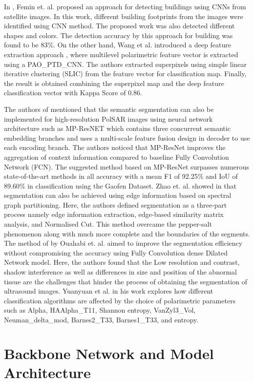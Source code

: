 \documentclass[a4paper,12pt]{spieman}  %
\begin{document}
\begin{spacing}{1}
\par In \citep{femin2020accurate}, Femin et. al. proposed an approach for detecting buildings using CNNs from satellite images. In this work, different building footprints from the images were identified using CNN method. The proposed work was also detected different shapes and colors. The detection accuracy by this approach for building was found to be 83\%. On the other hand, Wang et al. introduced a deep feature extraction approach \citep{PAOPTDCNN}, where multilevel polarimetric feature vector is extracted using a PAO\_PTD\_CNN. The authors extracted superpixels using simple linear iterative clustering (SLIC) from the feature vector for classification map. Finally, the result is obtained combining the superpixel map and the deep feature classification vector with Kappa Score of 0.86.
\par The authors of \citep{Ding_2021} mentioned that the semantic segmentation can also be implemented for high-resolution PolSAR images using neural network architecture such as MP-ResNET which contains three concurrent semantic embedding branches and uses a multi-scale feature fusion design in decoder to use each encoding branch. The authors noticed that MP-ResNet improves the aggregation of context information compared to baseline Fully Convolution Network (FCN). The suggested method based on MP-ResNet surpasses numerous state-of-the-art methods in all accuracy with a mean F1 of 92.25\% and IoU of 89.60\% in classification using the Gaofen Dataset. Zhao et. al. showed in \citep{zhao2013segmentation} that segmentation can also be achieved using edge information based on spectral graph partitioning. Here, the authors defined segmentation as a three-part process namely edge information extraction, edge-based similarity matrix analysis, and Normalised Cut. This method overcame the pepper-salt phenomenon along with much more complete and the boundaries of the segments. The method of \citep{ouahabi2021deep} by Ouahabi et. al. aimed to improve the segmentation efficiency without compromising the accuracy using Fully Convolution dense Dilated Network model. Here, the authors found that the Low resolution and contrast, shadow interference as well as differences in size and position of the abnormal tissue are the challenges that hinder the process of obtaining the segmentation of ultrasound images. Yuanyuan et al. in his work \citep{rs61212575} explores how different classification algorithms are affected by the choice of polarimetric parameters such as Alpha, HAAlpha\_T11, Shannon entropy, VanZyl3\_Vol, Neuman\_delta\_mod, Barnes2\_T33, Barnes1\_T33, and entropy. \section{Backbone Network and Model Architecture}

\end{spacing}
\end{document}
